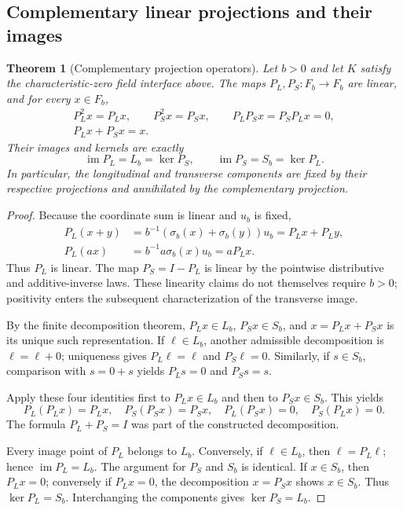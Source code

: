 \documentclass[11pt,reqno]{amsart}
\newtheorem{theorem}{Theorem}[section]
\theoremstyle{definition}\newtheorem{definition}[theorem]{Definition}
\theoremstyle{remark}\newtheorem{remark}[theorem]{Remark}
\begin{document}
\subsection{Complementary linear projections and their images}\label{main:sub-25}
\begin{theorem}[Complementary projection operators]\label{thm:projectionlaws}
Let $b>0$ and let $K$ satisfy the characteristic-zero field interface above. The maps $P_L,P_S:F_b\to F_b$ are linear, and for every $x\in F_b$,
\begin{gather*}
 P_L^2 x=P_Lx,\qquad P_S^2x=P_Sx,\qquad
 P_LP_Sx=P_SP_Lx=0,\\
 P_Lx+P_Sx=x.
\end{gather*}
Their images and kernels are exactly
\[
 \operatorname{im}P_L=L_b=\ker P_S,\qquad
 \operatorname{im}P_S=S_b=\ker P_L.
\]
In particular, the longitudinal and transverse components are fixed by their respective projections and annihilated by the complementary projection.
\end{theorem}
\begin{proof}
Because the coordinate sum is linear and $u_b$ is fixed,
\begin{align*}
 P_L(x+y)&=b^{-1}(\sigma_b(x)+\sigma_b(y))u_b
          =P_Lx+P_Ly,\\
 P_L(ax)&=b^{-1}a\sigma_b(x)u_b=aP_Lx.
\end{align*}
Thus $P_L$ is linear. The map $P_S=I-P_L$ is linear by the pointwise distributive and additive-inverse laws. These linearity claims do not themselves require $b>0$; positivity enters the subsequent characterization of the transverse image.

By the finite decomposition theorem, $P_Lx\in L_b$, $P_Sx\in S_b$, and $x=P_Lx+P_Sx$ is its unique such representation. If $\ell\in L_b$, another admissible decomposition is $\ell=\ell+0$; uniqueness gives $P_L\ell=\ell$ and $P_S\ell=0$. Similarly, if $s\in S_b$, comparison with $s=0+s$ yields $P_Ls=0$ and $P_Ss=s$.

Apply these four identities first to $P_Lx\in L_b$ and then to $P_Sx\in S_b$. This yields
\[
 P_L(P_Lx)=P_Lx,\quad P_S(P_Sx)=P_Sx,
 \quad P_L(P_Sx)=0,\quad P_S(P_Lx)=0.
\]
The formula $P_L+P_S=I$ was part of the constructed decomposition.

Every image point of $P_L$ belongs to $L_b$. Conversely, if $\ell\in L_b$, then $\ell=P_L\ell$; hence $\operatorname{im}P_L=L_b$. The argument for $P_S$ and $S_b$ is identical. If $x\in S_b$, then $P_Lx=0$; conversely if $P_Lx=0$, the decomposition $x=P_Sx$ shows $x\in S_b$. Thus $\ker P_L=S_b$. Interchanging the components gives $\ker P_S=L_b$.
\end{proof}
\end{document}

